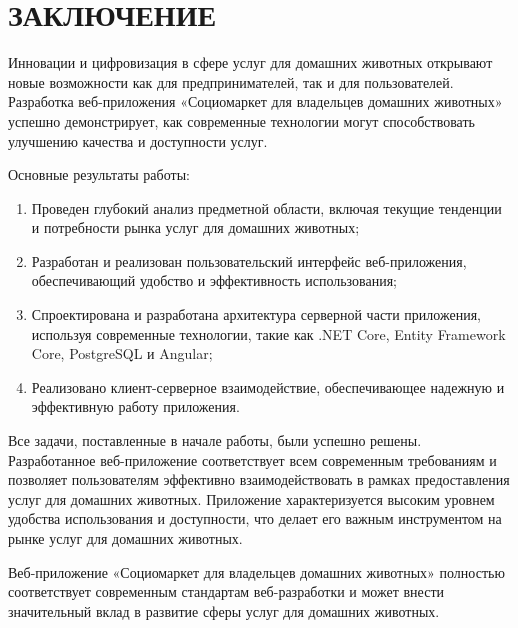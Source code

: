 \section*{ЗАКЛЮЧЕНИЕ}

Инновации и цифровизация в сфере услуг для домашних животных открывают новые возможности как для предпринимателей, так и для пользователей. Разработка веб-приложения «Социомаркет для владельцев домашних животных» успешно демонстрирует, как современные технологии могут способствовать улучшению качества и доступности услуг.

Основные результаты работы:

\begin{enumerate}
\item Проведен глубокий анализ предметной области, включая текущие тенденции и потребности рынка услуг для домашних животных;
\item Разработан и реализован пользовательский интерфейс веб-приложения, обеспечивающий удобство и эффективность использования;
\item Спроектирована и разработана архитектура серверной части приложения, используя современные технологии, такие как .NET Core, Entity Framework Core, PostgreSQL и Angular;
\item Реализовано клиент-серверное взаимодействие, обеспечивающее надежную и эффективную работу приложения.
\end{enumerate}

Все задачи, поставленные в начале работы, были успешно решены. Разработанное веб-приложение соответствует всем современным требованиям и позволяет пользователям эффективно взаимодействовать в рамках предоставления услуг для домашних животных. Приложение характеризуется высоким уровнем удобства использования и доступности, что делает его важным инструментом на рынке услуг для домашних животных.

Веб-приложение «Социомаркет для владельцев домашних животных» полностью соответствует современным стандартам веб-разработки и может внести значительный вклад в развитие сферы услуг для домашних животных.
